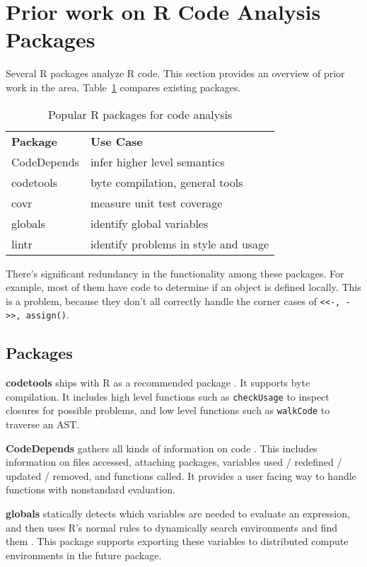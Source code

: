 \section{Prior work on R Code Analysis Packages}
\label{sec:code_analysis_packages}

Several R packages analyze R code. This
section provides an overview of prior work in the area.
Table~\ref{table-codeanalysis} compares existing packages.

\begin{table}[]
    \centering
    \label{table-codeanalysis}
    \begin{tabular}{ll}
        \textbf{Package}    & \textbf{Use Case}
        \\ CodeDepends  & infer higher level semantics
        \\ codetools    & byte compilation, general tools
        \\ covr         & measure unit test coverage
        \\ globals      & identify global variables
        \\ lintr        & identify problems in style and usage
    \end{tabular}
    \caption{Popular R packages for code analysis}
\end{table}

There's significant redundancy in the functionality among these packages.
For example, most of them have code to determine if an object is
defined locally. This is a problem, because they don't all correctly handle the
corner cases of \texttt{<<-, ->>, assign()}.

\subsection{Packages}

\textbf{codetools} ships with R as a recommended package
\cite{R-codetools}. It supports byte compilation. It includes high level
functions such as \texttt{checkUsage} to inspect closures for possible
problems, and low level functions such as \texttt{walkCode} to traverse an
AST.

\textbf{CodeDepends} gathers all kinds of information on code
\cite{R-CodeDepends}. This includes information on files accessed,
attaching packages, variables used / redefined / updated / removed,
and functions called. It provides a user facing way to handle functions
with nonstandard evaluation.

\textbf{globals} statically detects which variables are needed to evaluate
an expression, and then uses R's normal rules to dynamically search
environments and find them \cite{R-globals}. This package supports
exporting these variables to distributed compute environments in the future
package.

